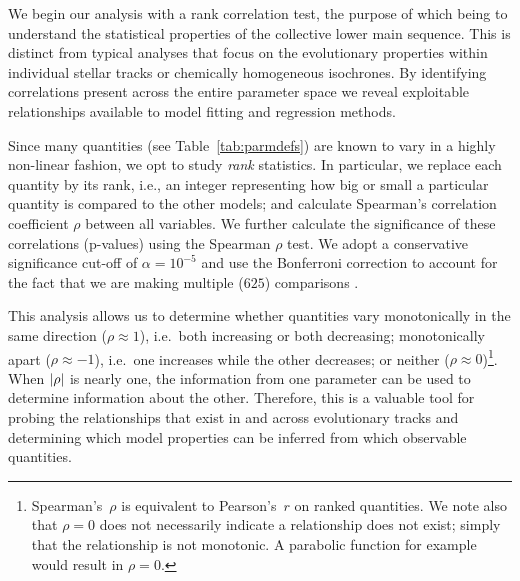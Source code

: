 We begin our analysis with a rank correlation test, the purpose of which being to understand the 
statistical properties of the collective lower main sequence.
This is distinct from typical analyses that focus on the evolutionary properties within 
individual stellar tracks or chemically homogeneous isochrones. By identifying correlations present across the entire parameter space we reveal exploitable relationships available to model fitting and regression methods. 


Since many quantities (see Table~\ref{tab:parmdefs}) are known to vary in a highly non-linear fashion, we opt to study \emph{rank} statistics. In particular, we replace each quantity by its rank, i.e., an integer representing how big or small a particular quantity is compared to the other models; and calculate Spearman's correlation coefficient $\rho$ between all variables. We further calculate the significance of these correlations (p-values) using the Spearman $\rho$ test. We adopt a conservative significance cut-off of ${\alpha = 10^{-5}}$ and use the Bonferroni correction to account for the fact that we are making multiple ($625$) comparisons \citep[e.g.,][]{doi:10.1080/01621459.1955.10501294}. 

This analysis allows us to determine whether quantities vary monotonically in the same direction (${\rho \approx 1}$), i.e.~both increasing or both decreasing; monotonically apart (${\rho \approx -1}$), i.e.~one increases while the other decreases; or neither (${\rho \approx 0}$)\footnote{Spearman's~$\rho$ is equivalent to Pearson's~$r$ on ranked quantities. We note also that ${\rho = 0}$ does not necessarily indicate a  relationship does not exist; simply that the relationship is not monotonic. A parabolic function for example would result in ${\rho = 0}$.}. When $\abs{\rho}$ is nearly one, the information from one parameter can be used to determine information about the other. Therefore, this is a valuable tool for probing the relationships that exist in and across evolutionary tracks and determining which model properties can be inferred from which observable quantities. 

